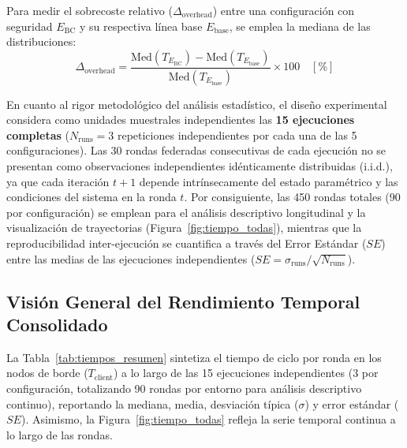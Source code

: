Para medir el sobrecoste relativo ($\Delta_{\text{overhead}}$) entre una configuración con seguridad $E_{\text{BC}}$ y su respectiva línea base $E_{\text{base}}$, se emplea la mediana de las distribuciones:
\begin{equation}
\Delta_{\text{overhead}} = \frac{\text{Med}(T_{E_{\text{BC}}}) - \text{Med}(T_{E_{\text{base}}})}{\text{Med}(T_{E_{\text{base}}})} \times 100 \quad [\%] \label{eq:overhead}
\end{equation}

En cuanto al rigor metodológico del análisis estadístico, el diseño experimental considera como unidades muestrales independientes las \textbf{15 ejecuciones completas} ($N_{\text{runs}} = 3$ repeticiones independientes por cada una de las 5 configuraciones). Las 30 rondas federadas consecutivas de cada ejecución no se presentan como observaciones independientes idénticamente distribuidas (i.i.d.), ya que cada iteración $t+1$ depende intrínsecamente del estado paramétrico y las condiciones del sistema en la ronda $t$. Por consiguiente, las 450 rondas totales ($90$ por configuración) se emplean para el análisis descriptivo longitudinal y la visualización de trayectorias (Figura~\ref{fig:tiempo_todas}), mientras que la reproducibilidad inter-ejecución se cuantifica a través del Error Estándar ($SE$) entre las medias de las ejecuciones independientes ($SE = \sigma_{\text{runs}} / \sqrt{N_{\text{runs}}}$).

\subsection{Visión General del Rendimiento Temporal Consolidado}
La Tabla~\ref{tab:tiempos_resumen} sintetiza el tiempo de ciclo por ronda en los nodos de borde ($T_{\text{client}}$) a lo largo de las 15 ejecuciones independientes (3 por configuración, totalizando 90 rondas por entorno para análisis descriptivo continuo), reportando la mediana, media, desviación típica ($\sigma$) y error estándar ($SE$). Asimismo, la Figura~\ref{fig:tiempo_todas} refleja la serie temporal continua a lo largo de las rondas.

